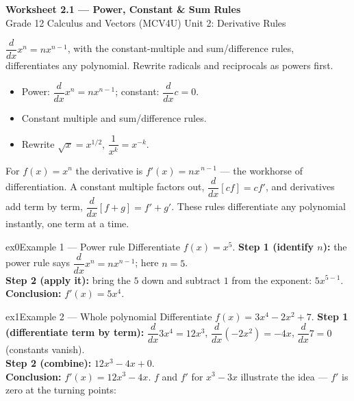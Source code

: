 \documentclass[11pt]{article}
\begin{document}
\begin{center}
{\LARGE\bfseries\color{titleblue}Worksheet 2.1 --- Power, Constant \& Sum Rules}\\[2pt]
{\small Grade 12 Calculus and Vectors (MCV4U) \textperiodcentered{} Unit 2: Derivative Rules}
\end{center}

\begin{ideabox}
$\dfrac{d}{dx}x^n=nx^{n-1}$, with the constant-multiple and sum/difference rules, differentiates any polynomial. Rewrite radicals and reciprocals as powers first.
\begin{itemize}[leftmargin=*,itemsep=2pt]
  \item Power: $\dfrac{d}{dx}x^n=nx^{n-1}$; constant: $\dfrac{d}{dx}c=0$.
  \item Constant multiple and sum/difference rules.
  \item Rewrite $\sqrt{x}=x^{1/2}$, $\dfrac1{x^k}=x^{-k}$.
\end{itemize}
\end{ideabox}

\begin{learnbox}
For $f(x)=x^n$ the derivative is $f'(x)=nx^{\,n-1}$ — the workhorse of differentiation.
A constant multiple factors out, $\dfrac{d}{dx}[cf]=cf'$, and derivatives add term by term, $\dfrac{d}{dx}[f+g]=f'+g'$.
These rules differentiate any polynomial instantly, one term at a time.
\end{learnbox}


\begin{example}{ex0}{Example 1 --- Power rule}
Differentiate $f(x)=x^5$.\soln
\textbf{Step 1 (identify $n$):} the power rule says $\dfrac{d}{dx}x^n=nx^{n-1}$; here $n=5$.\\[3pt]
\textbf{Step 2 (apply it):} bring the $5$ down and subtract $1$ from the exponent: $5x^{5-1}$.\\[3pt]
\textbf{Conclusion:} $f'(x)=5x^4$.
\end{example}

\begin{example}{ex1}{Example 2 --- Whole polynomial}
Differentiate $f(x)=3x^4-2x^2+7$.\soln
\textbf{Step 1 (differentiate term by term):} $\dfrac{d}{dx}3x^4=12x^3$, $\dfrac{d}{dx}(-2x^2)=-4x$, $\dfrac{d}{dx}7=0$ (constants vanish).\\[3pt]
\textbf{Step 2 (combine):} $12x^3-4x+0$.\\[3pt]
\textbf{Conclusion:} $f'(x)=12x^3-4x$. $f$ and $f'$ for $x^3-3x$ illustrate the idea --- $f'$ is zero at the turning points:
\end{example}
\end{document}
